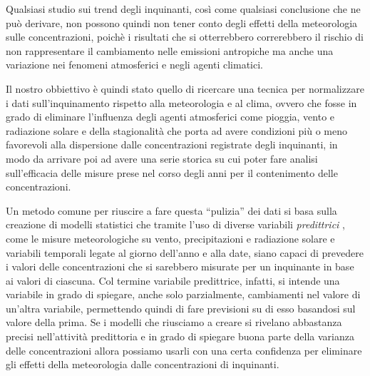 \documentclass[a4paper]{report}
\begin{document}
Qualsiasi studio sui trend degli inquinanti, così come qualsiasi conclusione che ne può derivare, non possono quindi non tener conto degli effetti della meteorologia sulle concentrazioni, poichè i risultati che si otterrebbero correrebbero il rischio di non rappresentare il cambiamento nelle emissioni antropiche ma anche una variazione nei fenomeni atmosferici e negli agenti climatici.  

Il nostro obbiettivo è quindi stato quello di ricercare una tecnica per normalizzare i dati sull'inquinamento rispetto alla meteorologia e al clima, ovvero che fosse in grado di eliminare l'influenza degli agenti atmosferici come pioggia, vento e radiazione solare e della stagionalità che porta ad avere condizioni più o meno favorevoli alla dispersione dalle concentrazioni registrate degli inquinanti, in modo da arrivare poi ad avere una serie storica su cui poter fare analisi sull'efficacia delle misure prese nel corso degli anni per il contenimento delle concentrazioni.  

Un metodo comune per riuscire a fare questa ``pulizia''%
dei dati si basa sulla creazione di modelli statistici che tramite l'uso di diverse variabili \textit{predittrici}
, come le misure meteorologiche su vento, precipitazioni e radiazione solare e variabili temporali legate al giorno dell'anno e alla date, siano capaci di prevedere i valori delle concentrazioni che si sarebbero misurate per un inquinante in base ai valori di ciascuna. Col termine variabile predittrice, infatti, si intende una variabile in grado di spiegare, anche solo parzialmente, cambiamenti nel valore di un'altra variabile, permettendo quindi di fare previsioni su di esso basandosi sul valore della prima. Se i modelli che riusciamo a creare si rivelano abbastanza precisi nell'attività predittoria e in grado di spiegare buona parte della varianza delle concentrazioni allora possiamo usarli con una certa confidenza per eliminare gli effetti della meteorologia dalle concentrazioni di inquinanti.

\end{document}

